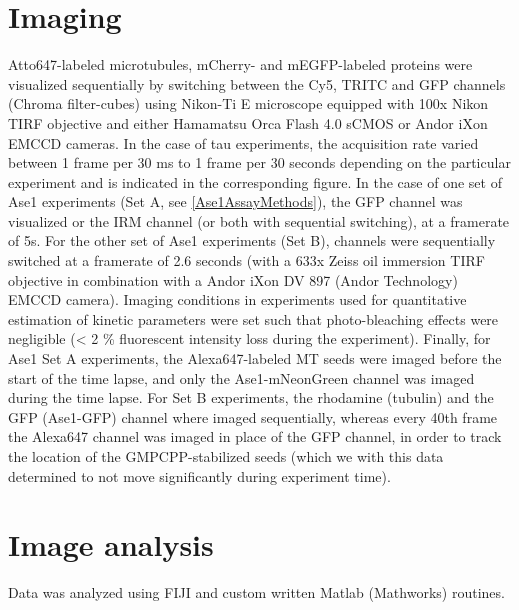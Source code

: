 \section{Imaging}
Atto647-labeled microtubules, mCherry- and mEGFP-labeled proteins were visualized sequentially by switching between the Cy5, TRITC and GFP channels (Chroma filter-cubes) using Nikon-Ti E microscope equipped with 100x Nikon TIRF objective and either Hamamatsu Orca Flash 4.0 sCMOS or Andor iXon EMCCD cameras. In the case of tau experiments, the acquisition rate varied between 1 frame per 30 ms to 1 frame per 30 seconds depending on the particular experiment and is indicated in the corresponding figure. In the case of one set of Ase1 experiments (Set A, see \autoref{Ase1AssayMethods}), the GFP channel was visualized or the IRM channel (or both with sequential switching), at a framerate of 5s. For the other set of Ase1 experiments (Set B), channels were sequentially switched at a framerate of 2.6 seconds (with a 633x Zeiss oil immersion TIRF objective in combination with a Andor iXon DV 897 (Andor Technology) EMCCD camera). Imaging conditions in experiments used for quantitative estimation of kinetic parameters were set such that photo-bleaching effects were negligible (< 2 \% fluorescent intensity loss during the experiment). Finally, for Ase1 Set A experiments, the Alexa647-labeled MT seeds were imaged before the start of the time lapse, and only the Ase1-mNeonGreen channel was imaged during the time lapse. For Set B experiments, the rhodamine (tubulin) and the GFP (Ase1-GFP) channel where imaged sequentially, whereas every 40th frame the Alexa647 channel was imaged in place of the GFP channel, in order to track the location of the GMPCPP-stabilized seeds (which we with this data determined to not move significantly during experiment time). 

\section{Image analysis}
\label{methods_analysis}
Data was analyzed using FIJI \parencite{Schindelin2012} and custom written Matlab (Mathworks) routines. 
